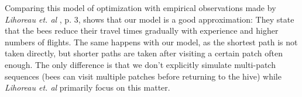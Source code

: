 		Comparing this model of optimization with empirical observations made by \textit{Lihoreau et. al} \cite{lihoreau11}, p. 3, shows that our model is a good approximation: They state that the bees reduce their travel times gradually with experience and higher numbers of flights. The same happens with our model, as the shortest path is not taken directly, but shorter paths are taken after visiting a certain patch often enough. The only difference is that we don't explicitly simulate multi-patch sequences (bees can visit multiple patches before returning to the hive) while \textit{Lihoreau et. al} primarily focus on this matter.
		